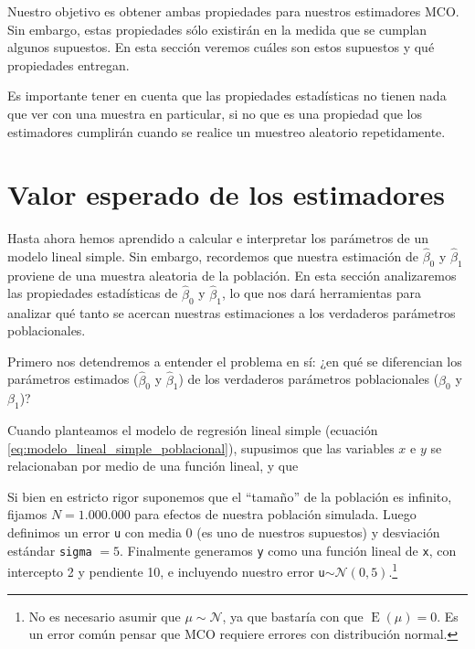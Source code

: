 \documentclass[12pt]{report}\usepackage[]{graphicx}\usepackage[]{color}
\newcommand{\E}{\operatorname{E}}
\begin{document}
Nuestro objetivo es obtener ambas propiedades para nuestros estimadores MCO.
Sin embargo, estas propiedades sólo existirán en la medida que se cumplan algunos supuestos. En esta sección veremos cuáles son estos supuestos y qué propiedades entregan.

Es importante tener en cuenta que las propiedades estadísticas no tienen nada que ver con una muestra en particular, si no que es una propiedad que los estimadores cumplirán cuando se realice un muestreo aleatorio repetidamente.



\hrulefill

\section{Valor esperado de los estimadores}

Hasta ahora hemos aprendido a calcular e interpretar los parámetros de un modelo lineal simple. Sin embargo, recordemos que nuestra estimación de $\hat\beta_0$ y $\hat\beta_1$ proviene de una muestra aleatoria de la población.
En esta sección analizaremos las propiedades estadísticas de $\hat\beta_0$ y $\hat\beta_1$, lo que nos dará herramientas para analizar qué tanto se acercan nuestras estimaciones a los verdaderos parámetros poblacionales.

Primero nos detendremos a entender el problema en sí: ¿en qué se diferencian los parámetros estimados ($\hat\beta_0$ y $\hat\beta_1$) de los verdaderos parámetros poblacionales ($\beta_0$ y $\beta_1$)?

Cuando planteamos el modelo de regresión lineal simple (ecuación \eqref{eq:modelo_lineal_simple_poblacional}), supusimos que las variables $x$ e $y$ se relacionaban por medio de una función lineal, y que 

Si bien en estricto rigor suponemos que el ``tamaño'' de la población es infinito, fijamos $N=1.000.000$ para efectos de nuestra población simulada.
Luego definimos un error \verb|u| con media 0 (es uno de nuestros supuestos) y desviación estándar \verb|sigma| $=5$. Finalmente generamos \verb|y| como una función lineal de \verb|x|, con intercepto 2 y pendiente 10, e incluyendo nuestro error \verb|u|$\sim \mathcal{N}(0, 5)$.\footnote{No es necesario asumir que $\mu \sim \mathcal{N}$, ya que bastaría con que $\E(\mu)=0$. Es un error común pensar que MCO requiere errores con distribución normal.}
\end{document}
